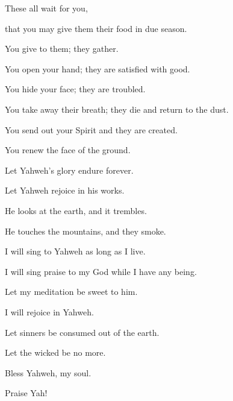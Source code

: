 {\par }{\Q {}These all wait for you,
\par }{\QB that you may give them their food in due season.
\par }{\Q {}You give to them; they gather.
\par }{\QB You open your hand; they are satisfied with good.
\par }{\Q {}You hide your face; they are troubled.
\par }{\QB You take away their breath; they die and return to the dust.
\par }{\Q {}You send out your Spirit and they are created.
\par }{\QB You renew the face of the ground.
\par }{\Q {}Let Yahweh’s glory endure forever.
\par }{\QB Let Yahweh rejoice in his works.
\par }{\Q {}He looks at the earth, and it trembles.
\par }{\QB He touches the mountains, and they smoke.
\par }{\Q {}I will sing to Yahweh as long as I live.
\par }{\QB I will sing praise to my God while I have any being.
\par }{\Q {}Let my meditation be sweet to him.
\par }{\QB I will rejoice in Yahweh.
\par }{\Q {}Let sinners be consumed out of the earth.
\par }{\QB Let the wicked be no more.
\par }{\QB Bless Yahweh, my soul.
\par }{\QB Praise Yah!

}
